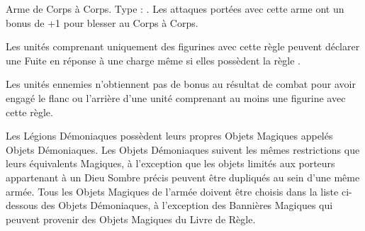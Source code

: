 \enditemlistonecol


\startitemlistonecol

\listitemonecol{\barbedclaws} Arme de Corps à Corps. Type : \hw{}. Les attaques portées avec cette arme ont un bonus de +1 pour blesser au Corps à Corps.

\listitemonecol{\elusive} Les unités comprenant uniquement des figurines avec cette règle peuvent déclarer une Fuite en réponse à une charge même si elles possèdent la règle \immunetopsychology{}.

\enditemlistonecol


\startitemlistonecol

\listitemonecol{\trailofmucus} Les unités ennemies n'obtiennent pas de bonus au résultat de combat pour avoir engagé le flanc ou l'arrière d'une unité comprenant au moins une figurine avec cette règle.

\enditemlistonecol

\closearmyarmoury









\spaceaftersection{}

Les Légions Démoniaques possèdent leurs propres Objets Magiques appelés Objets Démoniaques. Les Objets Démoniaques suivent les mêmes restrictions que leurs équivalents Magiques, à l'exception que les objets limités aux porteurs appartenant à un Dieu Sombre précis peuvent être dupliqués au sein d'une même armée. Tous les Objets Magiques de l'armée doivent être choisis dans la liste ci-dessous des Objets Démoniaques, à l'exception des Bannières Magiques qui peuvent provenir des Objets Magiques du Livre de Règle. 

